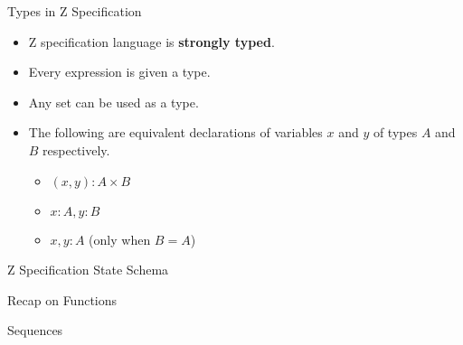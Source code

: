 \documentclass[aspectratio=169]{beamer}
\begin{document}
\begin{frame}{Types in Z Specification}
    \begin{itemize}
        \item Z specification language is \textbf{strongly typed}.
        \item Every expression is given a type.
        \item Any set can be used as a type.
        \item The following are equivalent declarations of variables $x$ and $y$ of types $A$ and $B$ respectively. 
        \begin{itemize}
            \item $(x, y) : A \times B$
            \item $x: A, y: B$
            \item $x, y : A$ (only when $B = A$)
        \end{itemize}
    \end{itemize}
\end{frame}

\begin{frame}{Z Specification State Schema}
\end{frame}

\begin{frame}{Recap on Functions}
\end{frame}

\begin{frame}{Sequences}
    
\end{frame}
\end{document}
